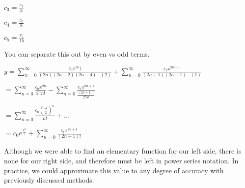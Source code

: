 \documentclass{article}
\begin{document}
\begin{enumerate}
$c_3 = \frac{c_1}{3}$

$c_4 = \frac{c_0}{8}$

$c_5 = \frac{c_1}{15}$

You can separate this out by even vs odd terms.

$y = \sum_{n=0}^{\infty} \frac{c_0 x^{2n})}{(2n)(2n-2)(2n-4)...(2)}+\sum_{n=0}^{\infty} \frac{c_1 x^{2n+1}}{(2n+1)(2n-1)...(1)}$

$=\sum_{n=0}^{\infty} \frac{c_0 x^{2n}}{2^n n!} - \sum_{n=0}^{\infty} \frac{c_1 x^{2n+1}}{\frac{(2n+1)!}{2^n n!}}$

$=\sum_{n=0}^{\infty} \frac{c_0 (\frac{x^2}{2})^n}{n!} + ...$

$=c_0 e^{\frac{x^2}{2}} + \sum_{n=0}^{\infty} \frac{c_1 x^{2n+1}}{(2n+1)!}$

Although we were able to find an elementary function for our left side, there is none for our right side, and therefore must be left in power series notation. In practice, we could approximate this value to any degree of accuracy with previously discussed methods.
\end{enumerate}
\end{document}
